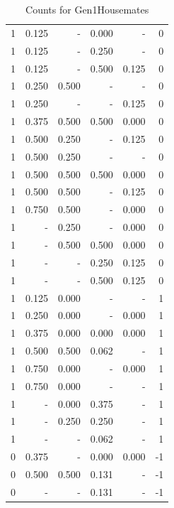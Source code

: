 \documentclass[a4paper]{article}\usepackage{graphicx, color}
\begin{document}
\begin{table}[ht]
\begin{tabular}{rrrrrr}
   \rowcolor{sosoColor} 1 & 0.125 & - & 0.000 & - & 0 \\ 
   \rowcolor{sosoColor} 1 & 0.125 & - & 0.250 & - & 0 \\ 
   \rowcolor{sosoColor} 1 & 0.125 & - & 0.500 & 0.125 & 0 \\ 
  1 & 0.250 & 0.500 & - & - & 0 \\ 
   \rowcolor{nullColor} 1 & 0.250 & - & - & 0.125 & 0 \\ 
   \rowcolor{goodColor} 1 & 0.375 & 0.500 & 0.500 & 0.000 & 0 \\ 
  1 & 0.500 & 0.250 & - & 0.125 & 0 \\ 
  1 & 0.500 & 0.250 & - & - & 0 \\ 
   \rowcolor{goodColor} 1 & 0.500 & 0.500 & 0.500 & 0.000 & 0 \\ 
  1 & 0.500 & 0.500 & - & 0.125 & 0 \\ 
  1 & 0.750 & 0.500 & - & 0.000 & 0 \\ 
  1 & - & 0.250 & - & 0.000 & 0 \\ 
   \rowcolor{goodColor} 1 & - & 0.500 & 0.500 & 0.000 & 0 \\ 
   \rowcolor{sosoColor} 1 & - & - & 0.250 & 0.125 & 0 \\ 
   \rowcolor{sosoColor} 1 & - & - & 0.500 & 0.125 & 0 \\ 
  1 & 0.125 & 0.000 & - & - & 1 \\ 
  1 & 0.250 & 0.000 & - & 0.000 & 1 \\ 
   \rowcolor{goodColor} 1 & 0.375 & 0.000 & 0.000 & 0.000 & 1 \\ 
   \rowcolor{badColor} 1 & 0.500 & 0.500 & 0.062 & - & 1 \\ 
  1 & 0.750 & 0.000 & - & 0.000 & 1 \\ 
  1 & 0.750 & 0.000 & - & - & 1 \\ 
   \rowcolor{badColor} 1 & - & 0.000 & 0.375 & - & 1 \\ 
   \rowcolor{goodColor} 1 & - & 0.250 & 0.250 & - & 1 \\ 
   \rowcolor{sosoColor} 1 & - & - & 0.062 & - & 1 \\ 
   \rowcolor{sosoColor} 0 & 0.375 & - & 0.000 & 0.000 & -1 \\ 
   \rowcolor{badColor} 0 & 0.500 & 0.500 & 0.131 & - & -1 \\ 
   \rowcolor{sosoColor} 0 & - & - & 0.131 & - & -1 \\ 
   \hline
\end{tabular}
\caption{Counts for Gen1Housemates} 
\end{table}
\end{document}
